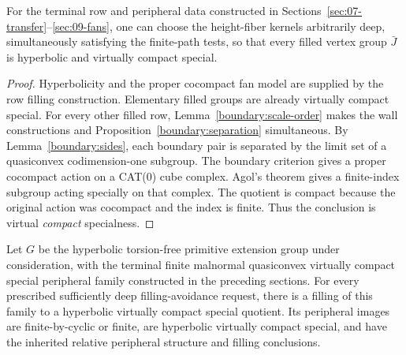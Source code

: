 \begin{theorem}\label{boundary:filled-vertices}
For the terminal row and peripheral data constructed in
Sections~\ref{sec:07-transfer}--\ref{sec:09-fans}, one can choose the
height-fiber kernels arbitrarily deep, simultaneously satisfying the
finite-path tests, so that every filled vertex group $\bar J$ is
hyperbolic and virtually compact special.
\end{theorem}

\begin{proof}
Hyperbolicity and the proper cocompact fan model are supplied by the row
filling construction. Elementary filled groups are already virtually
compact special. For every other filled row,
Lemma~\ref{boundary:scale-order} makes the wall constructions and
Proposition~\ref{boundary:separation} simultaneous. By
Lemma~\ref{boundary:sides}, each boundary pair is separated by the limit
set of a quasiconvex codimension-one subgroup. The boundary criterion
\cite[Theorem~1.4]{BergeronWise2012} gives a proper cocompact action on a
CAT(0) cube complex. Agol's theorem \cite[Theorem~1.1]{Agol2013} gives a
finite-index subgroup acting specially on that complex. The quotient is
compact because the original action was cocompact and the index is finite.
Thus the conclusion is virtual \emph{compact} specialness.
\end{proof}

\begin{theorem}\label{boundary:good-fillings}
Let $G$ be the hyperbolic torsion-free primitive extension group under
consideration, with the terminal finite malnormal quasiconvex virtually
compact special peripheral family constructed in the preceding sections.
For every prescribed sufficiently deep filling-avoidance request, there
is a filling of this family to a hyperbolic virtually compact special
quotient. Its peripheral images are finite-by-cyclic or finite, are
hyperbolic virtually compact special, and have the inherited relative
peripheral structure and filling conclusions.
\end{theorem}

